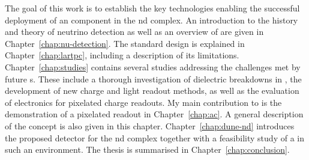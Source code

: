 The goal of this work is to establish the key technologies enabling the successful deployment of an \AC{} \lartpc{} component in the \dune{} \gls{nd} complex.
An introduction to the history and theory of neutrino detection as well as an overview of \dune{} are given in Chapter~\ref{chap:nu-detection}.
The standard \lartpc{} design is explained in Chapter~\ref{chap:lartpc}, including a description of its limitations.
Chapter~\ref{chap:studies} contains several studies addressing the challenges met by future \lartpc{}s.
These include a thorough investigation of dielectric breakdowns in \lar{}, the development of new charge and light readout methods, as well as the evaluation of electronics for pixelated charge readouts.
My main contribution to \AC{} is the demonstration of a pixelated \lartpc{} readout in Chapter~\ref{chap:ac}.
A general description of the \AC{} concept is also given in this chapter.
Chapter~\ref{chap:dune-nd} introduces the proposed \AC{} detector for the \dune{} \gls{nd} complex together with a feasibility study of a \lartpc{} in such an environment.
The thesis is summarised in Chapter~\ref{chap:conclusion}.
